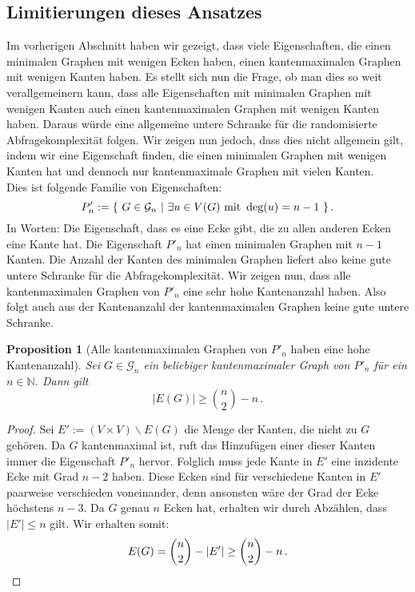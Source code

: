 \documentclass[10pt,a4paper, footheight=1mm]{scrreprt}
\newtheorem{Proposition}[definition]{Proposition}
\theoremstyle{definition}
\begin{document}
\subsection{Limitierungen dieses Ansatzes}
Im vorherigen Abschnitt haben wir gezeigt, dass viele Eigenschaften,
die einen  minimalen Graphen mit wenigen Ecken haben, einen kantenmaximalen
Graphen mit wenigen Kanten haben. Es stellt sich nun die Frage,
ob man dies so weit verallgemeinern kann, dass alle Eigenschaften
mit minimalen Graphen mit wenigen Kanten auch einen kantenmaximalen
Graphen mit wenigen Kanten haben. Daraus würde eine allgemeine
untere Schranke für die randomisierte Abfragekomplexität folgen.
Wir zeigen nun jedoch, dass dies nicht allgemein gilt, indem wir
eine Eigenschaft finden, die einen minimalen Graphen mit wenigen
Kanten hat und dennoch nur kantenmaximale Graphen mit vielen Kanten. \\
Dies ist folgende Familie von Eigenschaften:
$$ P'_n := \{ \ G \in \mathcal{G}_n \ 
| \ \exists u\in V(G) \textup{ mit } \deg(u) = n-1 \ \}\,.$$
In Worten: Die Eigenschaft, dass es eine Ecke gibt,
die zu allen anderen Ecken eine Kante hat.
Die Eigenschaft $P'_n$ hat einen minimalen Graphen mit
$n-1$ Kanten. Die Anzahl der Kanten des minimalen Graphen
liefert also keine gute untere Schranke für die Abfragekomplexität.
Wir zeigen nun, dass alle kantenmaximalen Graphen von $P'_n$
eine sehr hohe Kantenanzahl haben. Also folgt auch aus der Kantenanzahl
der kantenmaximalen Graphen keine gute untere Schranke.
\begin{Proposition}[Alle kantenmaximalen Graphen von $P'_n$ 
             haben eine hohe Kantenanzahl]
Sei $G\in \mathcal{G}_n$ ein beliebiger kantenmaximaler Graph
von $P'_n$ für ein $n\in \mathbb{N}$. Dann gilt
$$ |E(G)| \geq \binom{n}{2} - n\,.$$
\end{Proposition}
\begin{proof}
Sei $E' := (V \times V) \backslash E(G)$ die Menge der Kanten, die nicht
zu $G$ gehören. Da $G$ kantenmaximal ist, ruft das Hinzufügen
einer dieser Kanten immer die Eigenschaft $P'_n$ hervor.
Folglich muss jede Kante in $E'$ eine inzidente Ecke mit Grad
$n-2$ haben. Diese Ecken sind für verschiedene Kanten in $E'$
paarweise verschieden voneinander, denn ansonsten wäre der
Grad der Ecke höchstens $n-3$. Da $G$ genau $n$ Ecken hat,
erhalten wir durch Abzählen, dass $|E'| \leq n$ gilt.
Wir erhalten somit:
\begin{equation*}
E(G) = \binom{n}{2} - |E'| \geq \binom{n}{2} - n\,. \qedhere
\end{equation*}
\end{proof}
\end{document}
